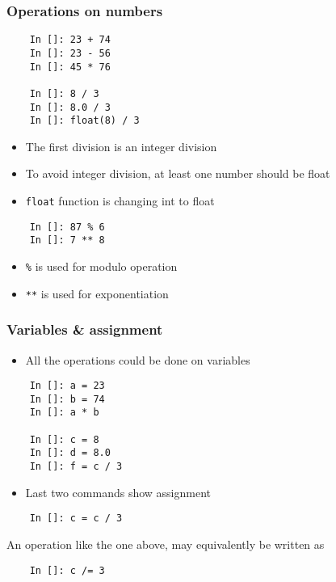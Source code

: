 \begin{frame}[fragile]
  \frametitle{Operations on numbers}
  \begin{lstlisting}
    In []: 23 + 74
    In []: 23 - 56
    In []: 45 * 76

    In []: 8 / 3 
    In []: 8.0 / 3
    In []: float(8) / 3
  \end{lstlisting}
  \begin{itemize}
  \item The first division is an integer division
  \item To avoid integer division, at least one number should be float
  \item \texttt{float} function is changing int to float
  \end{itemize}
  \begin{lstlisting}
    In []: 87 % 6
    In []: 7 ** 8
  \end{lstlisting} 
  \begin{itemize}
  \item \texttt{\%} is used for modulo operation
  \item \texttt{**} is used for exponentiation
  \end{itemize}
\end{frame}

\begin{frame}[fragile]
  \frametitle{Variables \& assignment}
  \begin{itemize}
  \item All the operations could be done on variables
  \end{itemize}
  \begin{lstlisting}
    In []: a = 23 
    In []: b = 74
    In []: a * b  
                  
    In []: c = 8
    In []: d = 8.0
    In []: f = c / 3
  \end{lstlisting}
  \begin{itemize}
  \item Last two commands show assignment
  \end{itemize}
  \begin{lstlisting}
    In []: c = c / 3
  \end{lstlisting}
  An operation like the one above, may equivalently be written as
  \begin{lstlisting}
    In []: c /= 3
  \end{lstlisting}
\end{frame}

